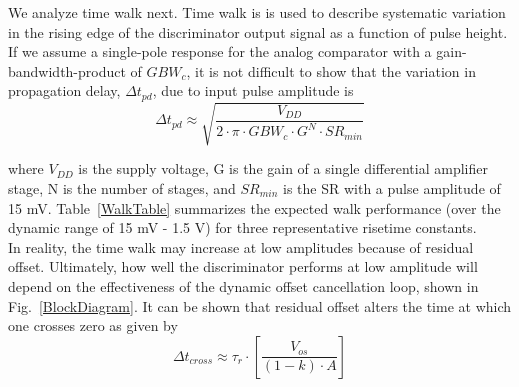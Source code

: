 \documentclass[12pt, onecolumn]{IEEEtran}
\begin{document}


We analyze time walk next.  Time walk is is used to describe systematic variation in the rising edge of the discriminator output signal as a function of pulse height.  If we assume a single-pole response for the analog comparator with a gain-bandwidth-product of $GBW_c$, it is not difficult to show that the variation in propagation delay, $\Delta t_{pd}$, due to input pulse amplitude is \\

\begin{equation*}
\Delta t_{pd} \approx  \sqrt{\frac{V_{DD}}{2 \cdot \pi \cdot GBW_c \cdot G^N \cdot SR_{min}}}
\end{equation*}


where $V_{DD}$ is the supply voltage, G is the gain of a single differential amplifier stage, N is the number of stages, and $SR_{min}$ is  the SR with a pulse amplitude of 15 mV.   Table~\ref{WalkTable} summarizes the expected walk performance (over the dynamic range of 15 mV - 1.5 V) for three representative risetime constants.\\


In reality, the time walk may increase at low amplitudes because of residual offset.  Ultimately, how well the discriminator performs at low amplitude will depend on the effectiveness of the dynamic offset cancellation loop, shown in Fig.~\ref{BlockDiagram}.  It can be shown that residual offset alters the time at which one crosses zero as given by\\

\begin{equation*}
\Delta t_{cross} \approx \tau_r \cdot \left[ \frac{V_{os}}{(1-k) \cdot A} \right]
\end{equation*}
\end{document}
